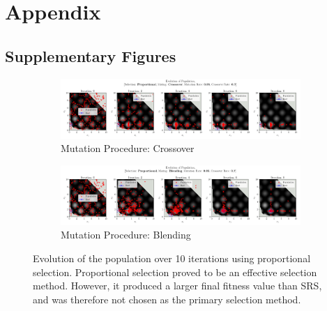 \documentclass[10pt]{article}
\begin{document}
\section{Appendix}
\subsection{Supplementary Figures}
\begin{figure}[H]
    \centering
    \begin{subfigure}{\textwidth}
        \centering
        \includegraphics[width=\textwidth]{../figures/KBF/10_iters/Proportional/Crossover/0.05_0.7_Population.png}
        \caption{Mutation Procedure: Crossover}
        \label{fig:CGA_flowchart_proportional_crossover}
    \end{subfigure}
    \begin{subfigure}{\textwidth}
        \centering
        \includegraphics[width=\textwidth]{../figures/KBF/10_iters/Proportional/Blending/0.05_0.7_Population.png}
        \caption{Mutation Procedure: Blending}
        \label{fig:CGA_flowchart_proportional_blending}
    \end{subfigure}
    \captionsetup{justification=centering}
    \caption{Evolution of the population over 10 iterations using proportional selection. Proportional selection proved to be an effective selection method. However, it produced a larger final fitness value than SRS, and was therefore not chosen as the primary selection method.}
    \label{fig:CGA_flowchart_proportional}
\end{figure}
\end{document}
